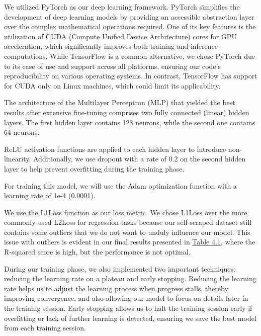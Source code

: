 We utilized PyTorch \cite{pytorch} as our deep learning framework. PyTorch simplifies the development of deep learning models by providing an accessible abstraction layer over the complex mathematical operations required. One of its key features is the utilization of CUDA (Compute Unified Device Architecture) cores for GPU acceleration, which significantly improves both training and inference computations. While TensorFlow \cite{tensorflow} is a common alternative, we chose PyTorch due to its ease of use and support across all platforms, ensuring our code's reproducibility on various operating systems. In contrast, TensorFlow has support for CUDA only on Linux machines, which could limit its applicability.

The architecture of the Multilayer Perceptron (MLP) that yielded the best results after extensive fine-tuning comprises two fully connected (linear) hidden layers. The first hidden layer contains 128 neurons, while the second one contains 64 neurons.

ReLU activation functions are applied to each hidden layer to introduce non-linearity. Additionally, we use dropout with a rate of 0.2 on the second hidden layer to help prevent overfitting during the training phase.

For training this model, we will use the Adam optimization function with a learning rate of 1e-4 (0.0001). 

We use the L1Loss function as our loss metric. We chose L1Loss over the more commonly used L2Loss for regression tasks because our self-scraped dataset still contains some outliers that we do not want to unduly influence our model. This issue with outliers is evident in our final results presented in \hyperref[tab:best-results]{Table 4.1}, where the R-squared score is high, but the performance is not optimal.

During our training phase, we also implemented two important techniques: reducing the learning rate on a plateau and early stopping. Reducing the learning rate helps us to adjust the learning process when progress stalls, thereby improving convergence, and also allowing our model to focus on details later in the training session. Early stopping allows us to halt the training session early if overfitting or lack of further learning is detected, ensuring we save the best model from each training session.

